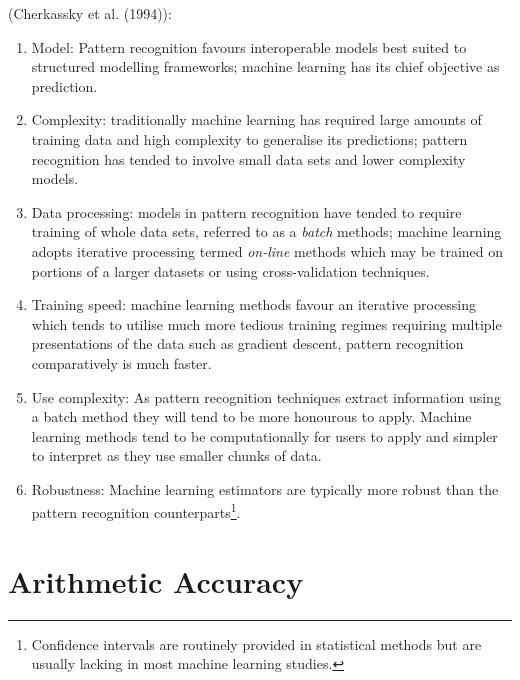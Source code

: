 \documentclass[7pt]{article}
\begin{document}
 (Cherkassky et al. (1994)):\\
\begin{enumerate}
\item Model: Pattern recognition favours interoperable models best suited  to structured modelling frameworks; machine learning has its chief objective as prediction. 
\item Complexity: traditionally machine learning has required large amounts of training data and high complexity to generalise its predictions; pattern recognition has tended to involve small data sets and lower complexity models. 
\item Data processing: models in pattern recognition have tended to require training of whole data sets, referred to as a \textit{batch} methods; machine learning adopts iterative processing termed \textit{on-line} methods which may be trained on portions of a larger datasets or using cross-validation techniques. 
\item Training speed: machine learning methods favour an iterative processing which tends to utilise much more tedious training regimes requiring multiple presentations of the data such as gradient descent, pattern recognition comparatively is much faster. 
\item Use complexity: As pattern recognition techniques extract information using a batch method they will tend to be more honourous to apply. Machine learning methods tend to be computationally for users to apply and simpler to interpret as they use smaller chunks of data.
\item Robustness: Machine learning estimators are typically more robust than the pattern recognition counterparts\footnote{Confidence intervals are routinely provided in statistical methods but are usually lacking in most machine learning studies.}.  
\end{enumerate}

\section*{Arithmetic Accuracy}
\end{document}
